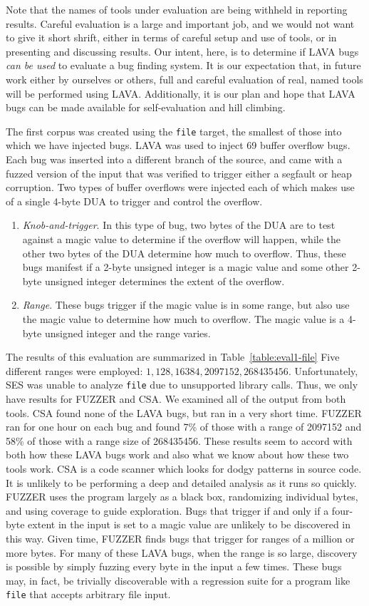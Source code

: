 Note that the names of tools under evaluation are being withheld in reporting results.
Careful evaluation is a large and important job, and we would not want to give it short shrift, either in terms of careful setup and use of tools, or in presenting and discussing results.
Our intent, here, is to determine if LAVA bugs \emph{can be used} to evaluate a bug finding system. 
It is our expectation that, in future work either by ourselves or others, full and careful evaluation of real, named tools will be performed using LAVA.
Additionally, it is our plan and hope that LAVA bugs can be made available for self-evaluation and hill climbing.


The first corpus was created using the \verb+file+ target, the smallest of those into which we have injected bugs.
LAVA was used to inject 69 buffer overflow bugs.
Each bug was inserted into a different branch of the source, and came with a fuzzed version of the input that was verified to trigger either a segfault or heap corruption.  
Two types of buffer overflows were injected each of which makes use of a single 4-byte DUA to trigger and control the overflow.
\begin{enumerate}
\item \emph{Knob-and-trigger}.  In this type of bug, two bytes of the DUA are to test against a magic value to determine if the overflow will happen, while the other two bytes of the DUA determine how much to overflow.   Thus, these bugs manifest if a 2-byte unsigned integer is a magic value and some other 2-byte unsigned integer determines the extent of the overflow. 
\item \emph{Range}.  These bugs trigger if the magic value is in some range, but also use the magic value to determine how much to overflow.
The magic value is a 4-byte unsigned integer and the range varies.
\end{enumerate}
The results of this evaluation are summarized in Table~\ref{table:eval1-file}
Five different ranges were employed: $1, 128, 16384, 2097152, 268435456$. 
Unfortunately, SES was unable to analyze \verb+file+ due to unsupported library calls.
Thus, we only have results for FUZZER and CSA.
We examined all of the output from both tools.  
CSA found none of the LAVA bugs, but ran in a very short time.  
FUZZER ran for one hour on each bug and found 7\% of those with a range of 2097152 and 58\% of those with a range size of 268435456.
These results seem to accord with both how these LAVA bugs work and also what we know about how these two tools work.
CSA is a code scanner which looks for dodgy patterns in source code.
It is unlikely to be performing a deep and detailed analysis as it runs so quickly.
FUZZER uses the program largely as a black box, randomizing individual bytes, and using coverage to guide exploration.  
Bugs that trigger if and only if a four-byte extent in the input is set to a magic value are unlikely to be discovered in this way.
Given time, FUZZER finds bugs that trigger for ranges of a million or more bytes. 
For many of these LAVA bugs, when the range is so large, discovery is possible by simply fuzzing every byte in the input a few times.  
These bugs may, in fact, be trivially discoverable with a regression suite for a program like \verb+file+ that accepts arbitrary file input.

